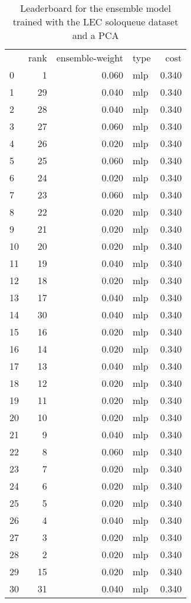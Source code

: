 \begin{table}[]
	\centering
	\begin{tabular}{lrrlr}
		   & rank & ensemble-weight & type & cost  \\
		0  & 1    & 0.060           & mlp  & 0.340 \\
		1  & 29   & 0.040           & mlp  & 0.340 \\
		2  & 28   & 0.040           & mlp  & 0.340 \\
		3  & 27   & 0.060           & mlp  & 0.340 \\
		4  & 26   & 0.020           & mlp  & 0.340 \\
		5  & 25   & 0.060           & mlp  & 0.340 \\
		6  & 24   & 0.020           & mlp  & 0.340 \\
		7  & 23   & 0.060           & mlp  & 0.340 \\
		8  & 22   & 0.020           & mlp  & 0.340 \\
		9  & 21   & 0.020           & mlp  & 0.340 \\
		10 & 20   & 0.020           & mlp  & 0.340 \\
		11 & 19   & 0.040           & mlp  & 0.340 \\
		12 & 18   & 0.020           & mlp  & 0.340 \\
		13 & 17   & 0.040           & mlp  & 0.340 \\
		14 & 30   & 0.040           & mlp  & 0.340 \\
		15 & 16   & 0.020           & mlp  & 0.340 \\
		16 & 14   & 0.020           & mlp  & 0.340 \\
		17 & 13   & 0.040           & mlp  & 0.340 \\
		18 & 12   & 0.020           & mlp  & 0.340 \\
		19 & 11   & 0.020           & mlp  & 0.340 \\
		20 & 10   & 0.020           & mlp  & 0.340 \\
		21 & 9    & 0.040           & mlp  & 0.340 \\
		22 & 8    & 0.060           & mlp  & 0.340 \\
		23 & 7    & 0.020           & mlp  & 0.340 \\
		24 & 6    & 0.020           & mlp  & 0.340 \\
		25 & 5    & 0.020           & mlp  & 0.340 \\
		26 & 4    & 0.040           & mlp  & 0.340 \\
		27 & 3    & 0.020           & mlp  & 0.340 \\
		28 & 2    & 0.020           & mlp  & 0.340 \\
		29 & 15   & 0.020           & mlp  & 0.340 \\
		30 & 31   & 0.040           & mlp  & 0.340 \\
	\end{tabular}

	\caption{Leaderboard for the ensemble model trained with the LEC soloqueue dataset and a PCA}
	\label{tab:lb-lec-games-full-PCA}
\end{table}

